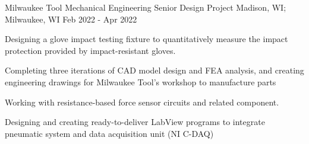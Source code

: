 

\begin{cventries}

  \cventry
    {Milwaukee Tool} %
    {Mechanical Engineering Senior Design Project} %
    {Madison, WI; Milwaukee, WI} %
    {Feb 2022 - Apr 2022} %
    {
      \begin{cvitems} %
        \item {Designing a glove impact testing fixture to quantitatively measure the impact protection provided by impact-resistant gloves.}
        \item {Completing three iterations of CAD model design and FEA analysis, and creating engineering drawings for Milwaukee Tool's workshop to manufacture parts}
        \item {Working with resistance-based force sensor circuits and related component.}
        \item {Designing and creating ready-to-deliver LabView programs to integrate pneumatic system and data acquisition unit (NI C-DAQ)}
      \end{cvitems}
    }



\end{cventries}
